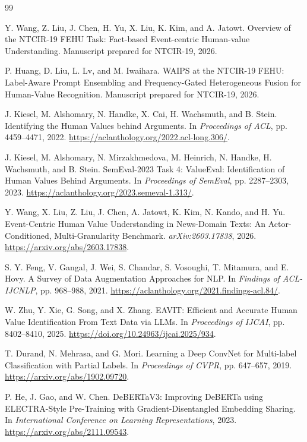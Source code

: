 \documentclass[12pt,a4paper]{article}
\begin{document}
\FloatBarrier
\clearpage
{}
{}
\begin{thebibliography}{99}
\raggedright
\setlength{\itemsep}{6pt}
Y. Wang, Z. Liu, J. Chen, H. Yu, X. Liu, K. Kim, and A. Jatowt.
Overview of the NTCIR-19 FEHU Task: Fact-based Event-centric Human-value Understanding.
Manuscript prepared for NTCIR-19, 2026.

P. Huang, D. Liu, L. Lv, and M. Iwaihara.
WAIPS at the NTCIR-19 FEHU: Label-Aware Prompt Ensembling and Frequency-Gated Heterogeneous Fusion for Human-Value Recognition.
Manuscript prepared for NTCIR-19, 2026.

J. Kiesel, M. Alshomary, N. Handke, X. Cai, H. Wachsmuth, and B. Stein.
Identifying the Human Values behind Arguments.
In \emph{Proceedings of ACL}, pp. 4459--4471, 2022.
\url{https://aclanthology.org/2022.acl-long.306/}.

J. Kiesel, M. Alshomary, N. Mirzakhmedova, M. Heinrich, N. Handke, H. Wachsmuth, and B. Stein.
SemEval-2023 Task 4: ValueEval: Identification of Human Values Behind Arguments.
In \emph{Proceedings of SemEval}, pp. 2287--2303, 2023.
\url{https://aclanthology.org/2023.semeval-1.313/}.

Y. Wang, X. Liu, Z. Liu, J. Chen, A. Jatowt, K. Kim, N. Kando, and H. Yu.
Event-Centric Human Value Understanding in News-Domain Texts: An Actor-Conditioned, Multi-Granularity Benchmark.
\emph{arXiv:2603.17838}, 2026.
\url{https://arxiv.org/abs/2603.17838}.

S. Y. Feng, V. Gangal, J. Wei, S. Chandar, S. Vosoughi, T. Mitamura, and E. Hovy.
A Survey of Data Augmentation Approaches for NLP.
In \emph{Findings of ACL-IJCNLP}, pp. 968--988, 2021.
\url{https://aclanthology.org/2021.findings-acl.84/}.

W. Zhu, Y. Xie, G. Song, and X. Zhang.
EAVIT: Efficient and Accurate Human Value Identification From Text Data via LLMs.
In \emph{Proceedings of IJCAI}, pp. 8402--8410, 2025.
\url{https://doi.org/10.24963/ijcai.2025/934}.

T. Durand, N. Mehrasa, and G. Mori.
Learning a Deep ConvNet for Multi-label Classification with Partial Labels.
In \emph{Proceedings of CVPR}, pp. 647--657, 2019.
\url{https://arxiv.org/abs/1902.09720}.

P. He, J. Gao, and W. Chen.
DeBERTaV3: Improving DeBERTa using ELECTRA-Style Pre-Training with Gradient-Disentangled Embedding Sharing.
In \emph{International Conference on Learning Representations}, 2023.
\url{https://arxiv.org/abs/2111.09543}.


\end{thebibliography}
\end{document}
